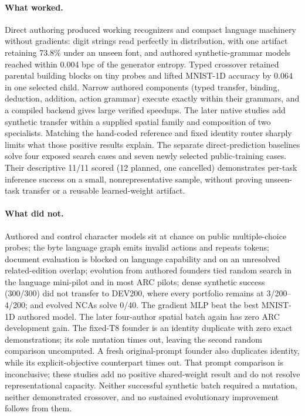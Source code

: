 \documentclass[11pt]{article}
\begin{document}
\paragraph{What worked.} Direct authoring produced working recognizers and compact language
machinery without gradients: digit strings read perfectly in distribution, with one artifact
retaining 73.8\% under an unseen font, and authored synthetic-grammar models reached within 0.004
bpc of the generator entropy. Typed crossover retained parental building blocks on tiny probes and
lifted MNIST-1D accuracy by 0.064 in one selected child. Narrow authored components (typed transfer,
binding, deduction, addition, action grammar) execute exactly within their grammars, and a compiled
backend gives large verified speedups. The later native studies add synthetic transfer within a
supplied spatial family and composition of two specialists. Matching the hand-coded reference
and fixed identity router sharply limits what those positive results explain.
The separate direct-prediction baselines solve four exposed search cases and seven newly selected
public-training cases. Their descriptive 11/11 scored (12 planned, one cancelled) demonstrates
per-task inference success on a small,
nonrepresentative sample, without proving unseen-task transfer or a reusable learned-weight artifact.

\paragraph{What did not.} Authored and control character models sit at chance on public
multiple-choice probes; the byte language graph emits invalid actions and repeats tokens; document
evaluation is blocked on language capability and on an unresolved related-edition overlap; evolution
from authored founders tied random search in the language mini-pilot and in most ARC pilots; dense
synthetic success (300/300) did not transfer to DEV200, where every portfolio remains at 3/200--4/200;
and evolved NCAs solve 0/40. The gradient MLP beat the best MNIST-1D authored model. The later
four-author spatial batch again has zero ARC development gain. The fixed-T8 founder is an
identity duplicate with zero exact demonstrations; its sole mutation times out, leaving the
second random comparison uncomputed. A fresh original-prompt founder also duplicates identity,
while its explicit-objective counterpart times out. That prompt comparison is inconclusive;
these studies add no positive shared-weight result and do not resolve representational capacity.
Neither successful synthetic
batch required a mutation, neither demonstrated crossover, and no sustained evolutionary
improvement follows from them.
\end{document}
